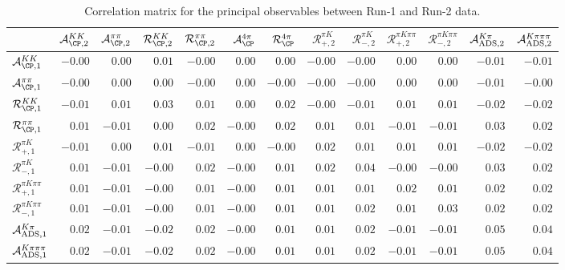 \begin{table}
\centering
\caption{Correlation matrix for the principal observables between Run-1 and Run-2 data.}
\begin{tabular}{l|rrrrrrrrrrrr}
    & $\mathcal{A}_{\CP,2}^{KK}$& $\mathcal{A}_{\CP,2}^{\pi\pi}$& $\mathcal{R}_{\CP,2}^{KK}$& $\mathcal{R}_{\CP,2}^{\pi\pi}$& $\mathcal{A}_{\CP}^{4\pi}$& $\mathcal{R}_{\CP}^{4\pi}$& $\mathcal{R}_{+,2}^{\pi K}$& $\mathcal{R}_{-,2}^{\pi K}$& $\mathcal{R}_{+,2}^{\pi K\pi\pi}$& $\mathcal{R}_{-,2}^{\pi K\pi\pi}$& $\mathcal{A}_{\rm ADS,2}^{K\pi}$& $\mathcal{A}_{\rm ADS,2}^{K\pi\pi\pi}$ \\
\midrule

$\mathcal{A}_{\CP,1}^{KK}$ & $-0.00$ & $0.00$ & $0.01$ & $-0.00$ & $0.00$ & $0.00$ & $-0.00$ & $-0.00$ & $0.00$ & $0.00$ & $-0.01$ & $-0.01$ \\

$\mathcal{A}_{\CP,1}^{\pi\pi}$ & $-0.00$ & $0.00$ & $0.00$ & $-0.00$ & $0.00$ & $-0.00$ & $-0.00$ & $-0.00$ & $0.00$ & $0.00$ & $-0.01$ & $-0.00$ \\

$\mathcal{R}_{\CP,1}^{KK}$ & $-0.01$ & $0.01$ & $0.03$ & $0.01$ & $0.00$ & $0.02$ & $-0.00$ & $-0.01$ & $0.01$ & $0.01$ & $-0.02$ & $-0.02$ \\

$\mathcal{R}_{\CP,1}^{\pi\pi}$ & $0.01$ & $-0.01$ & $0.00$ & $0.02$ & $-0.00$ & $0.02$ & $0.01$ & $0.01$ & $-0.01$ & $-0.01$ & $0.03$ & $0.02$ \\

$\mathcal{R}_{+,1}^{\pi K}$ & $-0.01$ & $0.00$ & $0.01$ & $-0.01$ & $0.00$ & $-0.00$ & $0.02$ & $0.01$ & $0.01$ & $0.01$ & $-0.02$ & $-0.02$ \\

$\mathcal{R}_{-,1}^{\pi K}$ & $0.01$ & $-0.01$ & $-0.00$ & $0.02$ & $-0.00$ & $0.01$ & $0.02$ & $0.04$ & $-0.00$ & $-0.00$ & $0.03$ & $0.02$ \\

$\mathcal{R}_{+,1}^{\pi K\pi\pi}$ & $0.01$ & $-0.01$ & $-0.00$ & $0.01$ & $-0.00$ & $0.01$ & $0.01$ & $0.01$ & $0.02$ & $0.01$ & $0.02$ & $0.02$ \\

$\mathcal{R}_{-,1}^{\pi K\pi\pi}$ & $0.01$ & $-0.01$ & $-0.00$ & $0.01$ & $-0.00$ & $0.01$ & $0.01$ & $0.02$ & $0.01$ & $0.03$ & $0.02$ & $0.02$ \\

$\mathcal{A}_{\rm ADS,1}^{K\pi}$ & $0.02$ & $-0.01$ & $-0.02$ & $0.02$ & $-0.00$ & $0.01$ & $0.01$ & $0.02$ & $-0.01$ & $-0.01$ & $0.05$ & $0.04$ \\

$\mathcal{A}_{\rm ADS,1}^{K\pi\pi\pi}$ & $0.02$ & $-0.01$ & $-0.02$ & $0.02$ & $-0.00$ & $0.01$ & $0.01$ & $0.02$ & $-0.01$ & $-0.01$ & $0.05$ & $0.04$ \\
\end{tabular}
\label{tab:correlation_1v2}
\end{table}
